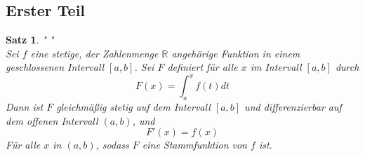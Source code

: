 \documentclass[fontsize=12pt,paper=a4,DIV12,cleardoublepage=empty, 
liststotoc,idxtotoc,bibtotoc]{article}
\newcommand{\RR}{\mathbb{R}}
\theoremstyle{plain}
\newtheorem{satz}{Satz}[subsection]
\theoremstyle{definition}
\begin{document}
	\subsection{Erster Teil}
	\begin{satz}" "\\
		Sei $f$ eine stetige, der Zahlenmenge $\RR$ angehörige Funktion in einem geschlossenen Intervall $[a, b]$. Sei $F$ definiert für alle $x$ im Intervall $[a, b]$ durch \\
			\begin{equation*}
				F(x)=\int_{a}^{x}f(t) dt
			\end{equation*}
		Dann ist $F$ gleichmäßig stetig auf dem Intervall $[a, b]$ und differenzierbar auf dem offenen Intervall $(a, b)$, und 
			\begin{equation*}
				F'(x)=f(x)
			\end{equation*}
		Für alle $x$ in $(a, b)$, sodass $F$ eine Stammfunktion von $f$ ist.\\\\
	
	\end{satz}
	
\end{document}
